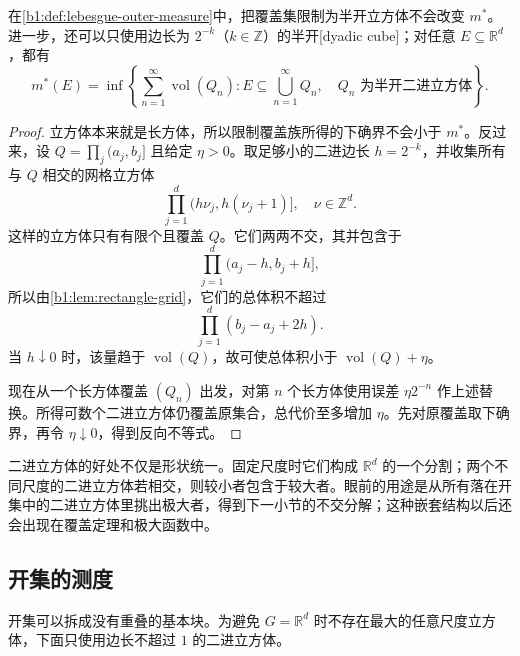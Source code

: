 \begin{proposition}
\label{b1:prop:cube-cover}
在\cref{b1:def:lebesgue-outer-measure}中，把覆盖集限制为半开立方体不会改变 \(m^*\)。进一步，还可以只使用边长为 \(2^{-k}\)（\(k\in\mathbb Z\)）的半开[dyadic cube]；对任意 \(E\subseteq\mathbb R^d\)，都有
\[
m^*(E)
=\inf\left\{
\sum_{n=1}^{\infty}\operatorname{vol}(Q_n):
E\subseteq\bigcup_{n=1}^{\infty}Q_n,\quad
Q_n\text{ 为半开二进立方体}
\right\}.
\]
\end{proposition}
\begin{proof}
立方体本来就是长方体，所以限制覆盖族所得的下确界不会小于 \(m^*\)。反过来，设
\(Q=\prod_j(a_j,b_j]\) 且给定 \(\eta>0\)。取足够小的二进边长 \(h=2^{-k}\)，并收集所有与 \(Q\) 相交的网格立方体
\[
\prod_{j=1}^{d}\bigl(h\nu_j,h(\nu_j+1)\bigr],
\quad \nu\in\mathbb Z^d.
\]
这样的立方体只有有限个且覆盖 \(Q\)。它们两两不交，其并包含于
\[
\prod_{j=1}^{d}(a_j-h,b_j+h],
\]
所以由\cref{b1:lem:rectangle-grid}，它们的总体积不超过
\[
\prod_{j=1}^{d}(b_j-a_j+2h).
\]
当 \(h\downarrow0\) 时，该量趋于 \(\operatorname{vol}(Q)\)，故可使总体积小于 \(\operatorname{vol}(Q)+\eta\)。

现在从一个长方体覆盖 \((Q_n)\) 出发，对第 \(n\) 个长方体使用误差 \(\eta2^{-n}\) 作上述替换。所得可数个二进立方体仍覆盖原集合，总代价至多增加 \(\eta\)。先对原覆盖取下确界，再令 \(\eta\downarrow0\)，得到反向不等式。
\end{proof}

二进立方体的好处不仅是形状统一。固定尺度时它们构成 \(\mathbb R^d\) 的一个分割；两个不同尺度的二进立方体若相交，则较小者包含于较大者。眼前的用途是从所有落在开集中的二进立方体里挑出极大者，得到下一小节的不交分解；这种嵌套结构以后还会出现在覆盖定理和极大函数中。

\subsection{开集的测度}
\label{b1:subsec:030104}

开集可以拆成没有重叠的基本块。为避免 \(G=\mathbb R^d\) 时不存在最大的任意尺度立方体，下面只使用边长不超过 \(1\) 的二进立方体。

